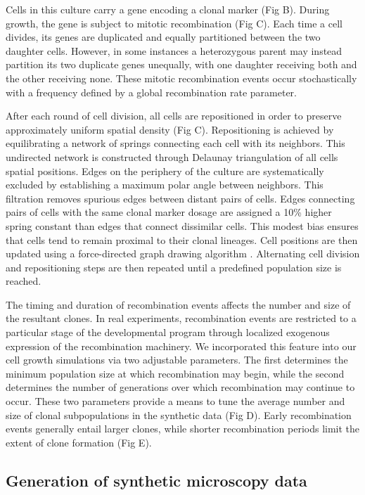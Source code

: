 \documentclass[10pt,letterpaper]{article}
\begin{document}
Cells in this culture carry a gene encoding a clonal marker (Fig B). During growth, the gene is subject to mitotic recombination (Fig C). Each time a cell divides, its genes are duplicated and equally partitioned between the two daughter cells. However, in some instances a heterozygous parent may instead partition its two duplicate genes unequally, with one daughter receiving both and the other receiving none. These mitotic recombination events occur stochastically with a frequency defined by a global recombination rate parameter. 

After each round of cell division, all cells are repositioned in order to preserve approximately uniform spatial density (Fig C). Repositioning is achieved by equilibrating a network of springs connecting each cell with its neighbors. This undirected network is constructed through Delaunay triangulation of all cells spatial positions. Edges on the periphery of the culture are systematically excluded by establishing a maximum polar angle between neighbors. This filtration removes spurious edges between distant pairs of cells. Edges connecting pairs of cells with the same clonal marker dosage are assigned a 10\% higher spring constant than edges that connect dissimilar cells. This modest bias ensures that cells tend to remain proximal to their clonal lineages. Cell positions are then updated using a force-directed graph drawing algorithm \cite{Kamada1989}. Alternating cell division and repositioning steps are then repeated until a predefined population size is reached. 

The timing and duration of recombination events affects the number and size of the resultant clones. In real experiments, recombination events are restricted to a particular stage of the developmental program through localized exogenous expression of the recombination machinery. We incorporated this feature into our cell growth simulations via two adjustable parameters. The first determines the minimum population size at which recombination may begin, while the second determines the number of generations over which recombination may continue to occur. These two parameters provide a means to tune the average number and size of clonal subpopulations in the synthetic data (Fig D). Early recombination events generally entail larger clones, while shorter recombination periods limit the extent of clone formation (Fig E).


\subsection*{Generation of synthetic microscopy data}
\end{document}
